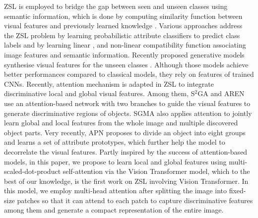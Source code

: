 \documentclass[a4paper,11pt]{article}
\newcommand{\anjan}[1]{\textcolor{red}{Anjan: #1}}
\newcommand{\myparagraph}[1]{\vspace{4pt}\noindent{\bf #1}}
\begin{document}
\myparagraph{Zero-Shot Learning:} ZSL is employed to bridge the gap between seen and unseen classes using semantic information, which is done by computing similarity function between visual features and previously learned knowledge \cite{romera-paredes15}. Various approaches address the ZSL problem by learning probabilistic attribute classifiers to predict class labels \cite{5206594, ConSE} and by learning linear \cite{DeViSE, SJE, ALE}, and non-linear \cite{LATEM} compatibility function associating image features and semantic information. Recently proposed generative models synthesise visual features for the unseen classes \cite{8578679, Schnfeld2019GeneralizedZA}. Although those models achieve better performances compared to classical models, they rely on features of trained CNNs. Recently, attention mechanism is adapted in ZSL to integrate discriminative local and global visual features. Among them, S$^2$GA \cite{S2GA} and AREN \cite{AREN} use an attention-based network with two branches to guide the visual features to generate discriminative regions of objects. SGMA \cite{SGMA} also applies attention to jointly learn global and local features from the whole image and multiple discovered object parts. Very recently, APN \cite{APN} proposes to divide an object into eight groups and learns a set of attribute prototypes, which further help the model to decorrelate the visual features. Partly inspired by the success of attention-based models, in this paper, we propose to learn local and global features using multi-scaled-dot-product self-attention via the Vision Transformer model, which to the best of our knowledge, is the first work on ZSL involving Vision Transformer. In this model, we employ multi-head attention after splitting the image into fixed-size patches so that it can attend to each patch to capture discriminative features among them and generate a compact representation of the entire image.
\end{document}

